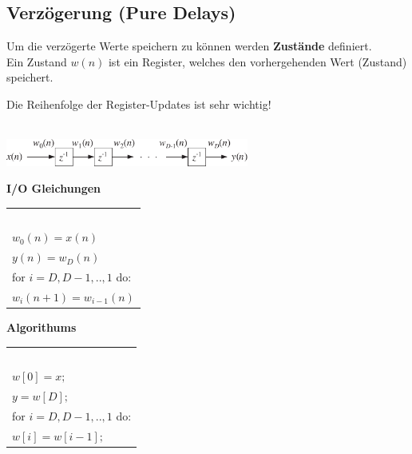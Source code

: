 	\subsection{Verzögerung (Pure Delays)}
		Um die verzögerte Werte speichern zu können werden \textbf{Zustände} definiert.\\ Ein Zustand $w(n)$ ist ein Register, welches den vorhergehenden Wert (Zustand) speichert. \\[0.2cm]
		\begin{danger}
		 Die Reihenfolge der Register-Updates ist sehr wichtig!
		\end{danger}\\[0.3cm]
		\includegraphics[width = 0.6\textwidth]{pic/delayD.pdf}\\[0.4cm]
		\begin{minipage}{0.3\textwidth}
			\textbf{I/O Gleichungen}\\[0.2cm]
			\begin{tabular}{|l|}
			\hline $ $\\[-0.3cm]
				$w_0(n) = x(n)$\\
				$y(n) = w_D(n)$\\[0.2cm]
				for $i = D,D-1,..,1$ do:\\
				$w_i(n+1) = w_{i-1}(n)$\\[0.2cm]
			\hline     
			\end{tabular}
		\end{minipage}
		\begin{minipage}{0.4\textwidth}
			\textbf{Algorithums}\\[0.2cm]
			\begin{tabular}{|l|}
			\hline $ $\\[-0.3cm]
				$w[0] = x;$\\
				$y = w[D]; $\\[0.2cm]
				for $i = D,D-1,..,1$ do:\\
				$w[i] = w[i-1];$\\[0.2cm]
			\hline     
			\end{tabular} 
		\end{minipage}

\newpage
